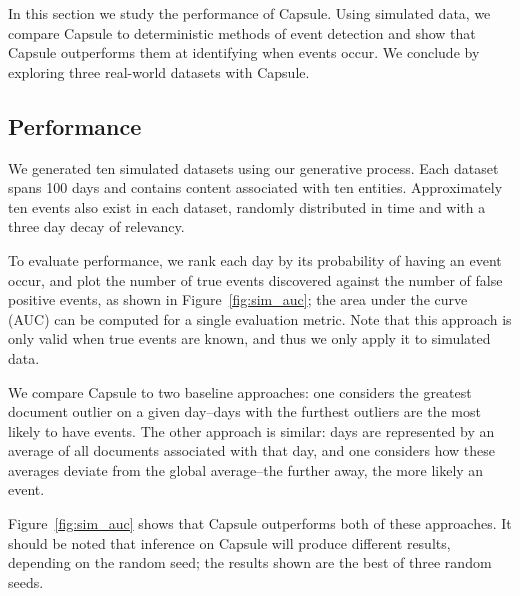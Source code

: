 In this section we study the performance of Capsule. Using simulated data, we compare Capsule to deterministic methods of event detection and show that Capsule outperforms them at identifying when events occur.  
We conclude by exploring three real-world datasets with Capsule.

\subsection{Performance}

We generated ten simulated datasets using our generative process.  Each dataset spans 100 days and contains content associated with ten entities.  Approximately ten events also exist in each dataset, randomly distributed in time and with a three day decay of relevancy.

To evaluate performance, we rank each day by its probability of having an event occur, and plot the number of true events discovered against the number of false positive events, as shown in Figure~\ref{fig:sim_auc}; the area under the curve (AUC) can be computed for a single evaluation metric.  Note that this approach is only valid when true events are known, and thus we only apply it to simulated data.

We compare Capsule to two baseline approaches: one considers the greatest document outlier on a given day--days with the furthest outliers are the most likely to have events.  The other approach is similar: days are represented by an average of all documents associated with that day, and one considers how these averages deviate from the global average--the further away, the more likely an event.

Figure~\ref{fig:sim_auc} shows that Capsule outperforms both of these approaches.  It should be noted that inference on Capsule will produce different results, depending on the random seed; the results shown are the best of three random seeds.

